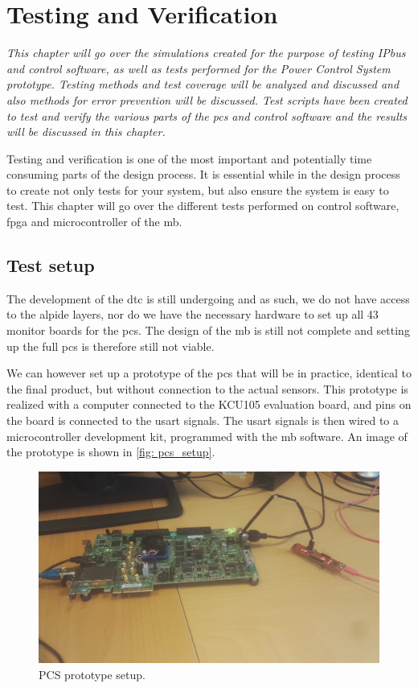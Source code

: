 \documentclass[main.tex]{subfiles}
\begin{document}
\section{Testing and Verification}

\textit{This chapter will go over the simulations created for the purpose of testing IPbus and control software, as well as tests performed for the Power Control System prototype. Testing methods and test coverage will be analyzed and discussed and also methods for error prevention will be discussed. Test scripts have been created to test and verify the various parts of the \gls{pcs} and control software and the results will be discussed in this chapter.}

Testing and verification is one of the most important and potentially time consuming parts of the design process. It is essential while in the design process to create not only tests for your system, but also ensure the system is easy to test. This chapter will go over the different tests performed on control software, \gls{fpga} and microcontroller of the \gls{mb}.

\subsection{Test setup}
\label{ssec: test_setup}

The development of the \gls{dtc} is still undergoing and as such, we do not have access to the \gls{alpide} layers, nor do we have the necessary hardware to set up all 43 monitor boards for the \gls{pcs}. The design of the \gls{mb} is still not complete and setting up the full \gls{pcs} is therefore still not viable.

We can however set up a prototype of the \gls{pcs} that will be in practice, identical to the final product, but without connection to the actual sensors. This prototype is realized with a computer connected to the KCU105 evaluation board, and pins on the board is connected to the \gls{usart} signals. The \gls{usart} signals is then wired to a microcontroller development kit, programmed with the \gls{mb} software. An image of the prototype is shown in \autoref{fig: pcs_setup}.

\begin{figure}[!htpb]
    \centering
    \includegraphics[width=14cm]{images/pcs_setup.jpg}
    \caption{PCS prototype setup.}
    \label{fig: pcs_setup}
\end{figure}
\FloatBarrier
\end{document}

